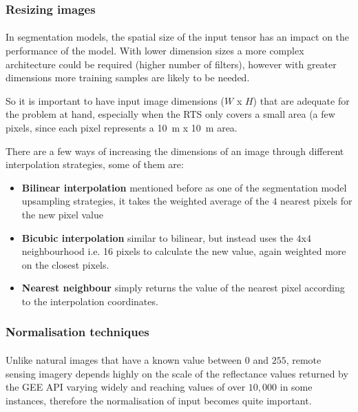 \subsubsection{Resizing images} \label{img_resize}
\paragraph{}
In segmentation models, the spatial size of the input tensor has an impact on the performance of the model. With lower dimension sizes a more complex architecture could be required (higher number of filters), however with  greater dimensions more training samples are likely to be needed.

So it is important to have input image dimensions ($W$ x $H$) that are adequate for the problem at hand, especially when the \gls{RTS} only covers a small area (a few pixels, since each pixel represents a 10 m x 10 m area.

There are a few ways of increasing the dimensions of an image through different interpolation strategies, some of them are:
    \begin{itemize}
        \item \textbf{Bilinear interpolation} mentioned before as one of the segmentation model upsampling strategies, it takes the weighted average of the $4$ nearest pixels for the new pixel value
        \item \textbf{Bicubic interpolation} similar to bilinear, but instead uses the  $4$x$4$ neighbourhood i.e. 16 pixels to calculate the new value, again weighted more on the closest pixels. 
        \item \textbf{Nearest neighbour} simply returns the value of the nearest pixel according to the interpolation coordinates.
    \end{itemize}
\subsubsection{Normalisation techniques} \label{img_norm}
\paragraph{}
Unlike natural images that have a known value between $0$ and $255$, remote sensing imagery depends highly on the scale of the reflectance values returned by the \gls{GEE} API varying widely and reaching values of over  $10,000$ in some instances, therefore the normalisation of input becomes quite important.

